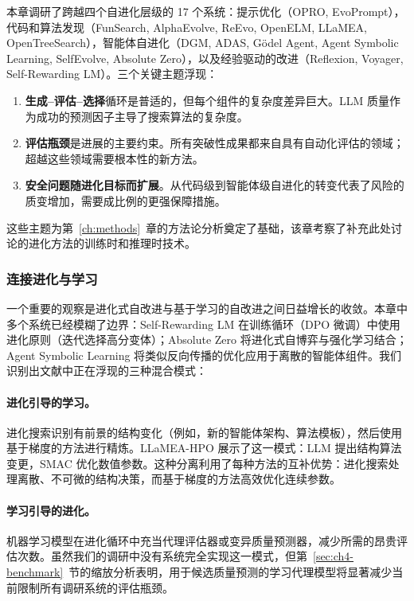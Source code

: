 本章调研了跨越四个自进化层级的 17 个系统：提示优化（OPRO, EvoPrompt），代码和算法发现（FunSearch, AlphaEvolve, ReEvo, OpenELM, LLaMEA, OpenTreeSearch），智能体自进化（DGM, ADAS, G\"{o}del Agent, Agent Symbolic Learning, SelfEvolve, Absolute Zero），以及经验驱动的改进（Reflexion, Voyager, Self-Rewarding LM）。三个关键主题浮现：

\begin{enumerate}
    \item \textbf{生成--评估--选择}循环是普适的，但每个组件的复杂度差异巨大。LLM 质量作为成功的预测因子主导了搜索算法的复杂度。
    \item \textbf{评估瓶颈}是进展的主要约束。所有突破性成果都来自具有自动化评估的领域；超越这些领域需要根本性的新方法。
    \item \textbf{安全问题随进化目标而扩展}。从代码级到智能体级自进化的转变代表了风险的质变增加，需要成比例的更强保障措施。
\end{enumerate}

这些主题为第~\ref{ch:methods}~章的方法论分析奠定了基础，该章考察了补充此处讨论的进化方法的训练时和推理时技术。

\subsubsection{连接进化与学习}

一个重要的观察是进化式自改进与基于学习的自改进之间日益增长的收敛。本章中多个系统已经模糊了边界：Self-Rewarding LM 在训练循环（DPO 微调）中使用进化原则（迭代选择高分变体）；Absolute Zero 将进化式自博弈与强化学习结合；Agent Symbolic Learning 将类似反向传播的优化应用于离散的智能体组件。我们识别出文献中正在浮现的三种混合模式：

\paragraph{进化引导的学习。}
进化搜索识别有前景的结构变化（例如，新的智能体架构、算法模板），然后使用基于梯度的方法进行精炼。LLaMEA-HPO 展示了这一模式：LLM 提出结构算法变更，SMAC 优化数值参数。这种分离利用了每种方法的互补优势：进化搜索处理离散、不可微的结构决策，而基于梯度的方法高效优化连续参数。

\paragraph{学习引导的进化。}
机器学习模型在进化循环中充当代理评估器或变异质量预测器，减少所需的昂贵评估次数。虽然我们的调研中没有系统完全实现这一模式，但第~\ref{sec:ch4-benchmark}~节的缩放分析表明，用于候选质量预测的学习代理模型将显著减少当前限制所有调研系统的评估瓶颈。

